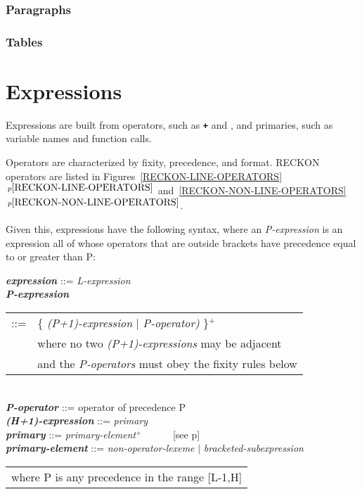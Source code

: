 \documentclass[12pt]{article}
\newcommand{\TT}[1]{{\tt \bfseries #1}}
\newcommand{\emkey}[1]{{\em \bfseries #1}}
\newcommand{\itemref}[1]{\ref{#1}$\,^{p\pageref{#1}}$}
\newcommand{\pagref}[1]{p\pageref{#1}}
\newcommand{\PLUS}[1][]{{$^{+#1}$}}
\newenvironment{indpar}[1][0.3in]%
	{\begin{list}{}%
		     {\setlength{\itemsep}{0in}%
		      \setlength{\topsep}{0in}%
		      \setlength{\parsep}{1ex}%
		      \setlength{\labelwidth}{#1}%
		      \setlength{\leftmargin}{#1}%
		      \addtolength{\leftmargin}{\labelsep}}%
	 \item}%
	{\end{list}}
\begin{document}
\subsubsection{Paragraphs}
\label{PARAGRAPHS}

\subsubsection{Tables}
\label{TABLES}

\section{Expressions}

Expressions are built from operators, such as \TT{+} and \TT{*},
and primaries, such as variable names and function calls.

Operators are characterized by fixity, precedence, and format.
RECKON operators are listed in
Figures~\itemref{RECKON-LINE-OPERATORS}
and~\itemref{RECKON-NON-LINE-OPERATORS}.


Given this, expressions have the following syntax,
where an {\em P-expression}
is an expression all of whose operators that are outside brackets
have precedence equal to or greater than P:

\begin{indpar}\begin{minipage}{6in}
\emkey{expression}\label{EXPRESSION} ::= {\em L-expression}
\\[0.5ex]
\emkey{P-expression}
    \begin{tabular}[t]{@{}rl}
    ::= & \{ {\em (P+1)-expression} $|$ {\em P-operator)} \}\PLUS{} \\
        & where no two {\em (P+1)-expressions} may be adjacent \\ 
        & and the {\em P-operators} must obey the fixity rules below \\
    \end{tabular}
\\[0.5ex]
\emkey{P-operator} ::= operator of precedence P
\\[0.5ex]
\emkey{(H+1)-expression} ::= {\em primary}
\\[0.5ex]
\emkey{primary} ::= {\em primary-element}\PLUS{} ~~~~~ [see \pagref{PRIMARIES}]
\\[0.5ex]
\emkey{primary-element} ::= {\em non-operator-lexeme} $|$
                            {\em bracketed-subexpression}
\\[2.0ex]
\hspace*{3em}\begin{tabular}{l}
where P is any precedence in the range [L-1,H] \\
\end{tabular}
\end{minipage}\end{indpar}
\end{document}

